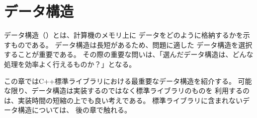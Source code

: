 \begin{comment}
\chapter{Data structures}

\index{data structure}

A \key{data structure} is a way to store
data in the memory of a computer.
It is important to choose an appropriate
data structure for a problem,
because each data structure has its own
advantages and disadvantages.
The crucial question is: which operations
are efficient in the chosen data structure?

This chapter introduces the most important
data structures in the C++ standard library.
It is a good idea to use the standard library
whenever possible,
because it will save a lot of time.
Later in the book we will learn about more sophisticated
data structures that are not available
in the standard library.

\end{comment}

\chapter{データ構造}


データ構造（）とは、計算機のメモリ上に
データをどのように格納するかを示すものである。
データ構造は長短があるため、問題に適した
データ構造を選択することが重要である。
その際の重要な問いは、「選んだデータ構造は、どんな処理を効率よく行えるものか？」となる。

この章ではC++標準ライブラリにおける最重要なデータ構造を紹介する。
可能な限り、データ構造は実装するのではなく標準ライブラリのものを
利用するのは、実装時間の短縮の上でも良い考えである。
標準ライブラリに含まれないデータ構造については、
後の章で触れる。

\begin{comment}
\section{Dynamic arrays}

\index{dynamic array}
\index{vector}

A \key{dynamic array} is an array whose
size can be changed during the execution
of the program.
The most popular dynamic array in C++ is
the \texttt{vector} structure,
which can be used almost like an ordinary array.

The following code creates an empty vector and
adds three elements to it:
\end{comment}

